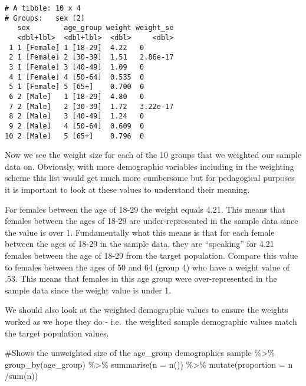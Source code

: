 \documentclass[
  letterpaper,
  DIV=11,
  numbers=noendperiod]{scrreprt}
\newenvironment{Shaded}{\begin{snugshade}}{\end{snugshade}}
\newcommand{\AttributeTok}[1]{\textcolor[rgb]{0.40,0.45,0.13}{#1}}
\newcommand{\CommentTok}[1]{\textcolor[rgb]{0.37,0.37,0.37}{#1}}
\newcommand{\FunctionTok}[1]{\textcolor[rgb]{0.28,0.35,0.67}{#1}}
\newcommand{\NormalTok}[1]{\textcolor[rgb]{0.00,0.23,0.31}{#1}}
\newcommand{\SpecialCharTok}[1]{\textcolor[rgb]{0.37,0.37,0.37}{#1}}
\begin{document}
\begin{verbatim}
# A tibble: 10 x 4
# Groups:   sex [2]
   sex        age_group weight weight_se
   <dbl+lbl>  <dbl+lbl>  <dbl>     <dbl>
 1 1 [Female] 1 [18-29]  4.22   0       
 2 1 [Female] 2 [30-39]  1.51   2.86e-17
 3 1 [Female] 3 [40-49]  1.09   0       
 4 1 [Female] 4 [50-64]  0.535  0       
 5 1 [Female] 5 [65+]    0.700  0       
 6 2 [Male]   1 [18-29]  4.80   0       
 7 2 [Male]   2 [30-39]  1.72   3.22e-17
 8 2 [Male]   3 [40-49]  1.24   0       
 9 2 [Male]   4 [50-64]  0.609  0       
10 2 [Male]   5 [65+]    0.796  0       
\end{verbatim}

Now we see the weight size for each of the 10 groups that we weighted
our sample data on. Obviously, with more demographic variables including
in the weighting scheme this list would get much more cumbersome but for
pedagogical purposes it is important to look at these values to
understand their meaning.

For females between the age of 18-29 the weight equals 4.21. This means
that females between the ages of 18-29 are under-represented in the
sample data since the value is over 1. Fundamentally what this means is
that for each female between the ages of 18-29 in the sample data, they
are ``speaking'' for 4.21 females between the age of 18-29 from the
target population. Compare this value to females between the ages of 50
and 64 (group 4) who have a weight value of .53. This means that females
in this age group were over-represented in the sample data since the
weight value is under 1.

We should also look at the weighted demographic values to ensure the
weights worked as we hope they do - i.e.~the weighted sample demographic
values match the target population values.

\begin{Shaded}
\begin{Highlighting}[]
\CommentTok{\#Shows the unweighted size of the age\_group demographics}
\NormalTok{sample }\SpecialCharTok{\%\textgreater{}\%}
  \FunctionTok{group\_by}\NormalTok{(age\_group) }\SpecialCharTok{\%\textgreater{}\%}
  \FunctionTok{summarise}\NormalTok{(}\AttributeTok{n =} \FunctionTok{n}\NormalTok{()) }\SpecialCharTok{\%\textgreater{}\%} 
  \FunctionTok{mutate}\NormalTok{(}\AttributeTok{proportion =}\NormalTok{ n }\SpecialCharTok{/}\FunctionTok{sum}\NormalTok{(n))}
\end{Highlighting}
\end{Shaded}
\end{document}
